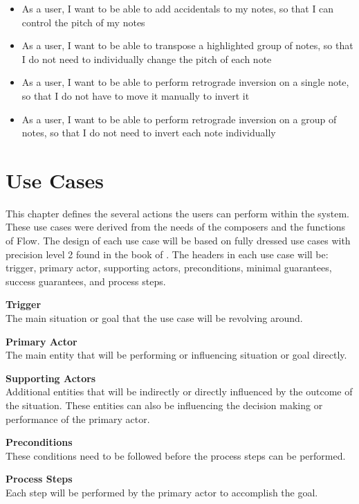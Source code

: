 \begin{itemize}
    \item As a user, I want to be able to add accidentals to my notes, so that I can control the pitch of my notes
    \item As a user, I want to be able to transpose a highlighted group of notes, so that I do not need to individually change the pitch of each note
    \item As a user, I want to be able to perform retrograde inversion on a single note, so that I do not have to move it manually to invert it
    \item As a user, I want to be able to perform retrograde inversion on a group of notes, so that I do not need to invert each note individually
  \end{itemize}

\chapter{Use Cases}

  This chapter defines the several actions the users can perform within the system. These use cases were derived from the needs of the composers and the functions of Flow. The design of each use case will be based on fully dressed use cases with precision level 2 found in the book of \cite{alistair2001writing}. The headers in each use case will be: trigger, primary actor, supporting actors, preconditions, minimal guarantees, success guarantees, and process steps.

  \textbf{Trigger} \\
  The main situation or goal that the use case will be revolving around. 

  \textbf{Primary Actor} \\
  The main entity that will be performing or influencing situation or goal directly.

  \textbf{Supporting Actors} \\
  Additional entities that will be indirectly or directly influenced by the outcome of the situation. These entities can also be influencing the decision making or performance of the primary actor.

  \textbf{Preconditions} \\
  These conditions need to be followed before the process steps can be performed.

  \textbf{Process Steps} \\
  Each step will be performed by the primary actor to accomplish the goal.

